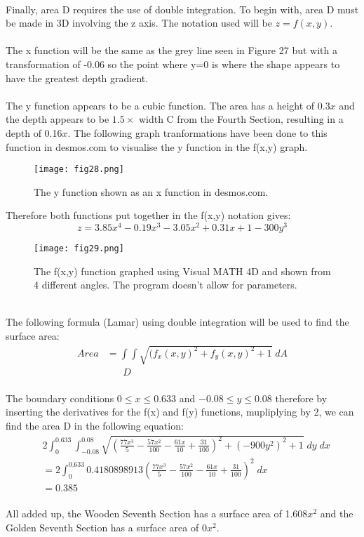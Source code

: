 \documentclass[a4paper,12pt]{article}
\begin{document}
\\Finally, area D requires the use of double integration. To begin with, area D must be made in 3D involving the z axis. The notation used will be $z=f(x,y)$. \\\\The x function will be the same as the grey line seen in Figure 27 but with a transformation of -0.06 so the point where y=0 is where the shape appears to have the greatest depth gradient. \\\\The y function appears to be a cubic function. The area has a height of 0.3$x$ and the depth appears to be $1.5\times$ width C from the Fourth Section, resulting in a depth of 0.16$x$. The following graph tranformations have been done to this function in desmos.com to visualise the y function in the f(x,y) graph.
\begin{figure}[h!]
\centering
\texttt{[image: fig28.png]}
\caption{The y function shown as an x function in desmos.com.}
\label{fig:clock28}
\end{figure}
Therefore both functions put together in the f(x,y) notation gives: $$z=3.85x^4-0.19x^3-3.05x^2+0.31x+1-300y^3$$
\begin{figure}[h!]
\centering
\texttt{[image: fig29.png]}
\caption{The f(x,y) function graphed using Visual MATH 4D and shown from 4 different angles. The program doesn't allow for parameters.}
\label{fig:clock29}
\end{figure}
\\The following formula (Lamar) using double integration will be used to find the surface area: 
\begin{equation}
\begin{aligned} 
Area&=\int{\int{\sqrt{(f_x(x,y)^2+f_y(x,y)^2+1}}}\;dA\\&\;\;\;\;\;\;D
\end{aligned}
\end{equation}\\The boundary conditions $0\leq x\leq0.633$ and $-0.08\leq y\leq0.08$ therefore by inserting the derivatives for the f(x) and f(y) functions, mupliplying by 2, we can find the area D in the following equation: 
\begin{equation}
\begin{aligned} 
&2\int_{0}^{0.633}{\int_{-0.08}^{0.08}{\sqrt{(\frac{77x^3}{5}-\frac{57x^2}{100}-\frac{61x}{10}+\frac{31}{100})^2+(-900y^2)^2+1}}}\;dy\;dx\\&=2\int_{0}^{0.633}{0.4180898913(\frac{77x^3}{5}-\frac{57x^2}{100}-\frac{61x}{10}+\frac{31}{100})^2}\;dx\\&=0.385
\end{aligned}
\end{equation}\\All added up, the Wooden Seventh Section has a surface area of 1.608$x^2$ and the Golden Seventh Section has a surface area of 0$x^2$.
\end{document}
